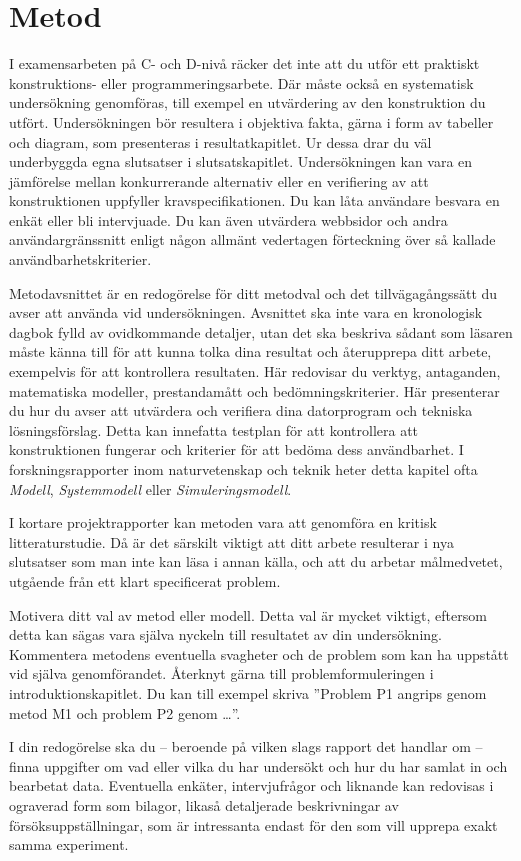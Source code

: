 \chapter{Metod}
\label{ch:methodology}
\noindent
I examensarbeten på C- och D-nivå räcker det inte att du utför ett praktiskt
konstruktions- eller programmeringsarbete.
Där måste också en systematisk undersökning genomföras, till exempel en
utvärdering av den konstruktion du utfört.
Undersökningen bör resultera i objektiva fakta, gärna i form av tabeller och
diagram, som presenteras i resultatkapitlet.
Ur dessa drar du väl underbyggda egna slutsatser i slutsatskapitlet.
Undersökningen kan vara en jämförelse mellan konkurrerande alternativ eller en
verifiering av att konstruktionen uppfyller kravspecifikationen.
Du kan låta användare besvara en enkät eller bli intervjuade.
Du kan även utvärdera webbsidor och andra användargränssnitt enligt någon
allmänt vedertagen förteckning över så kallade användbarhetskriterier.

Metodavsnittet är en redogörelse för ditt metodval och det tillvägagångssätt du
avser att använda vid undersökningen.
Avsnittet ska inte vara en kronologisk dagbok fylld av ovidkommande detaljer,
utan det ska beskriva sådant som läsaren måste känna till för att kunna tolka
dina resultat och återupprepa ditt arbete, exempelvis för att kontrollera
resultaten.
Här redovisar du verktyg, antaganden, matematiska modeller, prestandamått och
bedömningskriterier.
Här presenterar du hur du avser att utvärdera och verifiera dina datorprogram
och tekniska lösningsförslag.
Detta kan innefatta testplan för att kontrollera att konstruktionen fungerar
och kriterier för att bedöma dess användbarhet.
I forskningsrapporter inom naturvetenskap och teknik heter detta kapitel ofta
\emph{Modell}, \emph{Systemmodell} eller \emph{Simuleringsmodell}.

I kortare projektrapporter kan metoden vara att genomföra en kritisk
litteraturstudie.
Då är det särskilt viktigt att ditt arbete resulterar i nya slutsatser som man
inte kan läsa i annan källa, och att du arbetar målmedvetet, utgående från ett
klart specificerat problem.

Motivera ditt val av metod eller modell.
Detta val är mycket viktigt, eftersom detta kan sägas vara själva nyckeln till
resultatet av din undersökning.
Kommentera metodens eventuella svagheter och de problem som kan ha uppstått vid
själva genomförandet.
Återknyt gärna till problemformuleringen i introduktionskapitlet.
Du kan till exempel skriva ''Problem P1 angrips genom metod M1 och problem P2
genom \dots''.

I din redogörelse ska du -- beroende på vilken slags rapport det handlar om --
finna uppgifter om vad eller vilka du har undersökt och hur du har samlat in
och bearbetat data.
Eventuella enkäter, intervjufrågor och liknande kan redovisas i ograverad form
som bilagor, likaså detaljerade beskrivningar av försöksuppställningar, som är
intressanta endast för den som vill upprepa exakt samma experiment.
